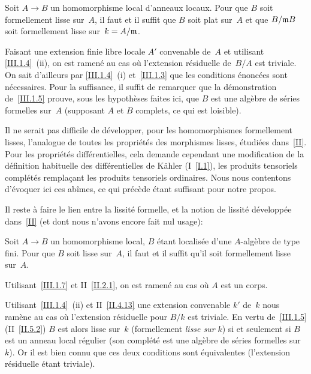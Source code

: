 \begin{corollaire}
\label{III.1.7}
Soit $A\to B$ un homomorphisme local d'anneaux locaux. Pour que $B$
soit formellement lisse sur~$A$, il faut et il suffit que $B$ soit
plat sur~$A$ et que $B/\mathfrak{m}B$ soit formellement lisse sur~$k=A/\mathfrak{m}$.
\end{corollaire}
Faisant une extension finie libre locale $A'$ convenable de~$A$ et
utilisant \ref{III.1.4}~(ii), on est ramen\'e au cas o\`u
l'extension r\'esiduelle de~$B/A$ est triviale.
On sait d'ailleurs par \ref{III.1.4}~(i) et~\ref{III.1.3} que les
conditions \'enonc\'ees sont n\'ecessaires. Pour la suffisance,
il suffit de remarquer que la d\'emonstration de~\ref{III.1.5}
prouve, sous les hypoth\`eses faites ici, que $B$ est une
alg\`ebre de s\'eries formelles sur~$A$ (supposant $A$ et $B$
complets, ce qui est loisible).

\begin{remarque}
\label{III.1.8}
Il ne serait pas difficile de d\'evelopper, pour les homomorphismes
formellement lisses, l'analogue de toutes les propri\'et\'es des
morphismes lisses, \'etudi\'ees dans~\ref{II}. Pour les
propri\'et\'es diff\'erentielles, cela demande cependant une
modification de la d\'efinition habituelle des diff\'erentielles
de K\"ahler (\cf I~\ref{I.1}), les produits tensoriels
compl\'et\'es rempla\c cant les produits tensoriels
ordinaires. Nous nous contentons d'\'evoquer ici ces ab\^imes,
ce qui pr\'ec\`ede \'etant suffisant pour notre propos.

Il reste \`a faire le lien entre la lissit\'e formelle, et la
notion de lissit\'e d\'evelopp\'ee dans~\ref{II} (et dont nous
n'avons encore fait nul usage):
\end{remarque}

\begin{proposition}
\label{III.1.9}
Soit $A\to B$ un homomorphisme local, $B$ \'etant localis\'ee
d'une $A$-alg\`ebre de type fini. Pour que $B$ soit lisse sur~$A$,
il faut et il suffit qu'il soit formellement lisse sur~$A$.
\end{proposition}

Utilisant~\ref{III.1.7} et II~\ref{II.2.1}, on est ramen\'e au cas
o\`u $A$ est un corps.

Utilisant~\ref{III.1.4}~(ii) et II~\ref{II.4.13} une extension convenable
$k'$ de~$k$ nous ram\`ene au cas o\`u l'extension r\'esiduelle
pour $B/k$ est triviale. En vertu de~\ref{III.1.5}
(\resp II~\ref{II.5.2}) $B$ est alors lisse sur~$k$ (\resp formellement
\emph{lisse sur} $k$) si et seulement si $B$ est un anneau local
r\'egulier (\resp son compl\'et\'e est une alg\`ebre de
s\'eries formelles sur~$k$). Or il est bien connu que ces deux
conditions sont \'equivalentes (l'extension r\'esiduelle \'etant
triviale).

